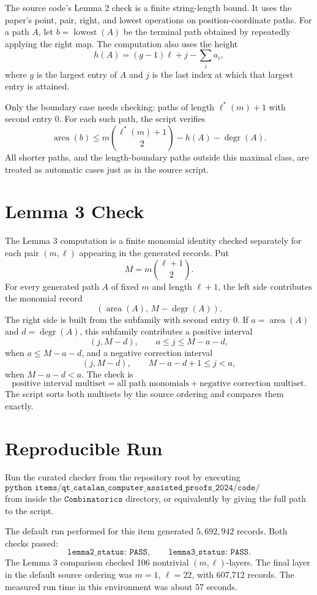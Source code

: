 \documentclass{article}
\newcommand{\degr}{\operatorname{degr}}
\begin{document}
The source code's Lemma 2 check is a finite string-length bound.  It uses the
paper's point, pair, right, and lowest operations on position-coordinate paths.
For a path \(A\), let \(b=\operatorname{lowest}(A)\) be the terminal path
obtained by repeatedly applying the right map.  The computation also uses the
height
\[
  h(A)=(g-1)\ell+j-\sum_i a_i,
\]
where \(g\) is the largest entry of \(A\) and \(j\) is the last index at which
that largest entry is attained.

Only the boundary case needs checking: paths of length \(\ell^*(m)+1\) with
second entry \(0\).  For each such path, the script verifies
\[
  \operatorname{area}(b)\le
  m\binom{\ell^*(m)+1}{2}-h(A)-\degr(A).
\]
All shorter paths, and the length-boundary paths outside this maximal class,
are treated as automatic cases just as in the source script.

\section{Lemma 3 Check}

The Lemma 3 computation is a finite monomial identity checked separately for
each pair \((m,\ell)\) appearing in the generated records.  Put
\[
  M=m\binom{\ell+1}{2}.
\]
For every generated path \(A\) of fixed \(m\) and length \(\ell+1\), the left
side contributes the monomial record
\[
  (\operatorname{area}(A),\,M-\degr(A)).
\]
The right side is built from the subfamily with second entry \(0\).  If
\(a=\operatorname{area}(A)\) and \(d=\degr(A)\), this subfamily contributes a
positive interval
\[
  (j,M-d),\qquad a\le j\le M-a-d,
\]
when \(a\le M-a-d\), and a negative correction interval
\[
  (j,M-d),\qquad M-a-d+1\le j<a,
\]
when \(M-a-d<a\).  The check is
\[
  \text{positive interval multiset}
  =
  \text{all path monomials}+\text{negative correction multiset}.
\]
The script sorts both multisets by the source ordering and compares them
exactly.

\section{Reproducible Run}

Run the curated checker from the repository root by executing
\[
  \texttt{python items/qt\_catalan\_computer\_assisted\_proofs\_2024/code/qt\_assisted\_2024.py}
\]
from inside the \(\texttt{Combinatorics}\) directory, or equivalently by giving
the full path to the script.

The default run performed for this item generated \(5{,}692{,}942\) records.
Both checks passed:
\[
  \texttt{lemma2\_status: PASS},\qquad
  \texttt{lemma3\_status: PASS}.
\]
The Lemma 3 comparison checked 106 nontrivial \((m,\ell)\)-layers.  The final
layer in the default source ordering was \(m=1\), \(\ell=22\), with 607,712
records.  The measured run time in this environment was about 57 seconds.
\end{document}
